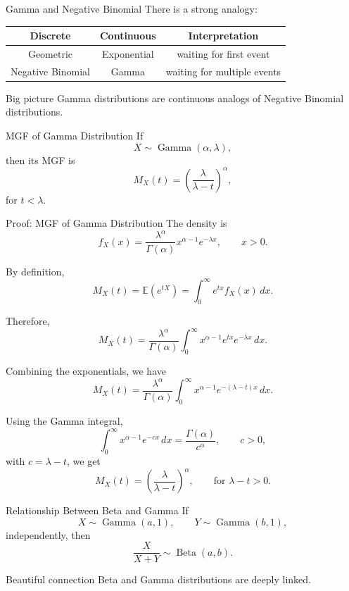 \begin{frame}{Gamma and Negative Binomial}
There is a strong analogy:

\vspace{0.25cm}

\begin{center}
\renewcommand{\arraystretch}{1.4}
\begin{tabular}{ccc}
\toprule
Discrete & Continuous & Interpretation \\
\midrule
Geometric & Exponential & waiting for first event \\
Negative Binomial & Gamma & waiting for multiple events \\
\bottomrule
\end{tabular}
\end{center}

\vspace{0.25cm}

\begin{keybox}{Big picture}
Gamma distributions are continuous analogs of Negative Binomial distributions.
\end{keybox}
\end{frame}
\begin{frame}{MGF of Gamma Distribution}
If
\[
X\sim \operatorname{Gamma}(\alpha,\lambda),
\]
then its MGF is
\[
M_X(t)
=
\left(
\frac{\lambda}{\lambda-t}
\right)^\alpha,
\]
for \(t<\lambda\).
\end{frame}



\begin{frame}{Proof: MGF of Gamma Distribution}
The density is
\[
f_X(x)
=
\frac{\lambda^\alpha}{\Gamma(\alpha)}
x^{\alpha-1}e^{-\lambda x},
\qquad x>0.
\]

By definition,
\[
M_X(t)
=
\mathbb{E}(e^{tX})
=
\int_0^\infty e^{tx} f_X(x)\,dx.
\]

Therefore,
\[
M_X(t)
=
\frac{\lambda^\alpha}{\Gamma(\alpha)}
\int_0^\infty
x^{\alpha-1}e^{tx}e^{-\lambda x}\,dx.
\]

Combining the exponentials, we have
\[
M_X(t)
=
\frac{\lambda^\alpha}{\Gamma(\alpha)}
\int_0^\infty
x^{\alpha-1}e^{-(\lambda-t)x}\,dx.
\]

Using the Gamma integral,
\[
\int_0^\infty x^{\alpha-1}e^{-cx}\,dx
=
\frac{\Gamma(\alpha)}{c^\alpha},
\qquad c>0,
\]
with \(c=\lambda-t\), we get
\[
M_X(t)
=
\left(
\frac{\lambda}{\lambda-t}
\right)^\alpha,
\qquad \text{for } \lambda-t>0.
\]
\end{frame}
\begin{frame}{Relationship Between Beta and Gamma}
If
\[
X\sim \operatorname{Gamma}(a,1),
\qquad
Y\sim \operatorname{Gamma}(b,1),
\]
independently, then
\[
{
\frac{X}{X+Y}
\sim
\operatorname{Beta}(a,b).
}
\]

\vspace{0.25cm}

\begin{keybox}{Beautiful connection}
Beta and Gamma distributions are deeply linked.
\end{keybox}
\end{frame}


